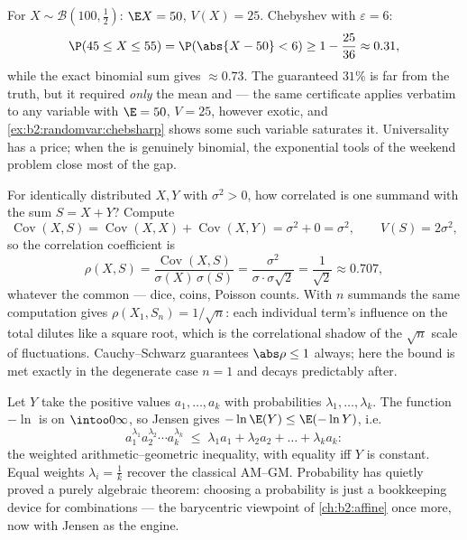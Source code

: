 \begin{example}\label{ex:b2:randomvar:hundredtosses}
For $X \sim \mathcal B(100, \frac12)$: $\E X = 50$, $V(X) =
25$. Chebyshev with $\varepsilon = 6$:
\[
\P(45 \leq X \leq 55) = \P(\abs{X - 50} < 6)
\geq 1 - \frac{25}{36} \approx 0.31 ,
\]
while the exact binomial sum gives $\approx 0.73$. The
guaranteed $31\%$ is far from the truth, but it required
\emph{only} the mean and  --- the same certificate
applies verbatim to any variable with $\E = 50$, $V = 25$,
however exotic, and \cref{ex:b2:randomvar:chebsharp} shows
some such variable saturates it. Universality has a price;
when the  is genuinely binomial, the exponential
tools of the weekend problem close most of the gap.
\end{example}

\begin{example}\label{ex:b2:randomvar:partwhole}
For  identically distributed $X, Y$ with 
$\sigma^2 > 0$, how correlated is one summand with the sum
$S = X + Y$? Compute
\[
\operatorname{Cov}(X, S) = \operatorname{Cov}(X, X) +
\operatorname{Cov}(X, Y) = \sigma^2 + 0 = \sigma^2,
\qquad V(S) = 2\sigma^2,
\]
so the correlation coefficient is
\[
\rho(X, S) = \frac{\operatorname{Cov}(X,
S)}{\sigma(X)\,\sigma(S)}
= \frac{\sigma^2}{\sigma\cdot\sigma\sqrt2}
= \frac{1}{\sqrt2} \approx 0.707 ,
\]
whatever the common  --- dice, coins, Poisson counts. With
$n$ summands the same computation gives $\rho(X_1, S_n) =
1/\sqrt n$: each individual term's influence on the total
dilutes like a square root, which is the correlational shadow
of the $\sqrt n$ scale of fluctuations. Cauchy--Schwarz
guarantees $\abs\rho \leq 1$ always; here the bound is met
exactly in the degenerate case $n = 1$ and decays predictably
after.
\end{example}

\begin{example}\label{ex:b2:randomvar:amgm}
Let $Y$ take the positive values $a_1, \dots, a_k$ with
probabilities $\lambda_1, \dots, \lambda_k$. The function
$-\ln$ is  on $\intoo0\infty$, so Jensen gives
$-\ln\E(Y) \leq \E(-\ln Y)$, i.e.
\[
a_1^{\lambda_1}a_2^{\lambda_2}\cdots a_k^{\lambda_k}
\;\leq\; \lambda_1a_1 + \lambda_2a_2 + \dots + \lambda_ka_k :
\]
the weighted arithmetic--geometric inequality, with equality
iff $Y$ is constant. Equal weights $\lambda_i = \frac1k$
recover the classical AM--GM. Probability has quietly proved
a purely algebraic theorem: choosing a probability  is
just a bookkeeping device for  combinations --- the
barycentric viewpoint of \cref{ch:b2:affine} once more, now
with Jensen as the engine.
\end{example}

